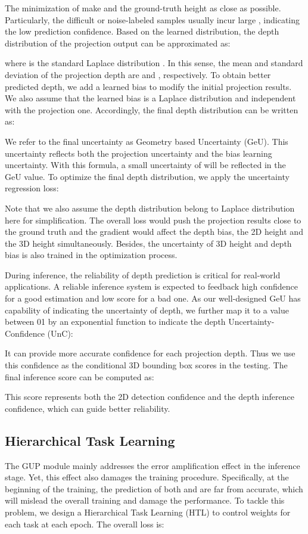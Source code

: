 \documentclass[10pt,twocolumn,letterpaper]{article}
\begin{document}
The minimization of  make  and the ground-truth height  as close as possible. Particularly, the difficult or noise-labeled samples usually incur large , indicating the low prediction confidence. Based on the learned  distribution, the depth distribution of the projection output  can be approximated as:

where  is the standard Laplace distribution . In this sense, the mean and standard deviation of the projection depth  are  and , respectively. 
To obtain better predicted depth, we add a learned bias to modify the initial projection results. We also assume that the learned bias is a Laplace distribution  and independent with the projection one. Accordingly, the final depth distribution can be written as:

We refer to the final uncertainty  as Geometry based Uncertainty (GeU). This uncertainty reflects both the projection uncertainty and the bias learning uncertainty. With this formula, a small uncertainty of  will be reflected in the GeU value. To optimize the final depth distribution, we apply the uncertainty regression loss:

Note that we also assume the depth distribution belong to Laplace distribution here for simplification. The overall loss would push the projection results close to the ground truth  and the gradient would affect the depth bias, the 2D height and the 3D height simultaneously. Besides, the uncertainty of 3D height and depth bias is also trained in the optimization process.


During inference, the reliability of depth prediction is critical for real-world applications. A reliable inference system is expected to feedback high confidence for a good estimation and low score for a bad one. As our well-designed GeU has capability of indicating the uncertainty of depth, we further map it to a value between 01 by an exponential function to indicate the depth Uncertainty-Confidence (UnC):

It can provide more accurate confidence for each projection depth. Thus we use this confidence as the conditional 3D bounding box scores  in the testing. The final inference score can be computed as:

This score represents both the 2D detection confidence and the depth inference confidence, which can guide better reliability. 



\subsection{Hierarchical Task Learning}
The GUP module mainly addresses the error amplification effect in the inference stage. Yet, this effect also damages the training procedure. Specifically, at the beginning of the training, the prediction of both  and  are far from accurate, which will mislead the overall training and damage the performance.  
To tackle this problem, we design a Hierarchical Task Learning (HTL) to control weights for each task at each epoch. The overall loss is:
\end{document}
